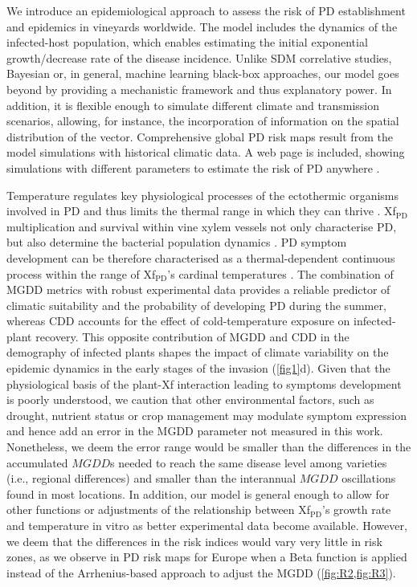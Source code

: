    We introduce an epidemiological approach to assess the risk of PD
    establishment and epidemics in vineyards worldwide. The model includes the
    dynamics of the infected-host population, which enables estimating the
    initial exponential growth/decrease rate of the disease incidence. Unlike
    SDM correlative studies, Bayesian or, in general, machine learning
    black-box approaches, our model goes beyond by providing a mechanistic
    framework and thus explanatory power. In addition, it is flexible enough to
    simulate different climate and transmission scenarios, allowing, for
    instance, the incorporation of information on the spatial distribution of
    the vector. Comprehensive global PD risk maps result from the model
    simulations with historical climatic data. A web page is included, showing
    simulations with different parameters to estimate the risk of PD anywhere
    \cite{Webpage}.

    Temperature regulates key physiological processes of the ectothermic
    organisms involved in PD and thus limits the thermal range in which they
    can thrive \cite{Coakley1999}. Xf$_{\textrm{PD}}$ multiplication and
    survival within vine xylem vessels not only characterise PD, but also
    determine the bacterial population dynamics
    \cite{fry1990multiplication,Feil2001}. PD symptom development can be
    therefore characterised as a thermal-dependent continuous process within
    the range of  Xf$_{\textrm{PD}}$'s cardinal temperatures \cite{Scherm1994}.
    The combination of MGDD metrics with robust experimental data provides a
    reliable predictor of climatic suitability and the probability of
    developing PD during the summer, whereas CDD accounts for the effect of
    cold-temperature exposure on infected-plant recovery. This opposite
    contribution of MGDD and CDD in the demography of infected plants shapes
    the impact of climate variability on the epidemic dynamics in the early
    stages of the invasion (\cref{fig1}d). Given that the physiological basis
    of the plant-Xf interaction leading to symptoms development is poorly
    understood, we caution that other environmental factors, such as drought,
    nutrient status or crop management may modulate symptom expression and
    hence add an error in the MGDD parameter not measured in this work.
    Nonetheless, we deem the error range would be smaller than the differences
    in the accumulated $MGDD$s needed to reach the same disease level among
    varieties (i.e., regional differences) and smaller than the interannual
$MGDD$ oscillations found in most locations. In addition, our model is general
    enough to allow for other functions or adjustments of the relationship
    between Xf$_{\textrm{PD}}$'s growth rate and temperature in vitro
    as better experimental data become available. However, we deem that the
    differences in the risk indices would vary very little in risk zones, as we
    observe in PD risk maps for Europe when a Beta function is applied instead
    of the Arrhenius-based approach to adjust the MGDD (\cref{fig:R2,fig:R3}).

